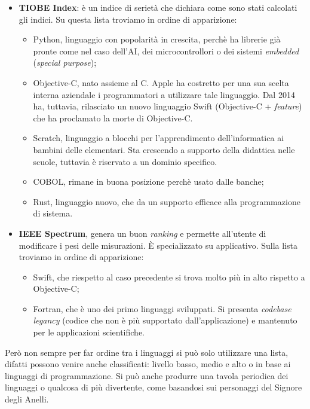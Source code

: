 \documentclass[10pt,a4paper]{book}
\begin{document}
\begin{itemize}
\item \textbf{TIOBE Index}: \`e un indice di seriet\`a che dichiara come sono stati calcolati gli indici. Su questa lista troviamo in ordine di apparizione:
\begin{itemize}
\item Python, linguaggio con popolarit\`a in crescita, perch\`e ha librerie gi\`a pronte come nel caso dell'AI, dei microcontrollori o dei sistemi \textit{embedded} (\textit{special purpose});
\item Objective-C, nato assieme al C. Apple ha costretto per una sua scelta interna aziendale i programmatori a utilizzare tale linguaggio. Dal 2014 ha, tuttavia, rilasciato un nuovo linguaggio Swift (Objective-C + \textit{feature}) che ha proclamato la morte di Objective-C.
\item Scratch, linguaggio a blocchi per l'apprendimento dell'informatica ai bambini delle elementari. Sta crescendo a supporto della didattica nelle scuole, tuttavia  \`e riservato a un dominio specifico.
\item COBOL, rimane in buona posizione perch\`e usato dalle banche;
\item Rust, linguaggio nuovo, che da un supporto efficace alla programmazione di sistema.
\end{itemize}
\item \textbf{IEEE Spectrum}, genera un buon \textit{ranking} e permette all'utente di modificare i pesi delle misurazioni. \`E specializzato su applicativo. Sulla lista troviamo in ordine di apparizione:
\begin{itemize}
\item Swift, che riespetto al caso precedente si trova molto pi\`u in alto rispetto a Objective-C;
\item Fortran, che \`e uno dei primo linguaggi sviluppati. Si presenta \textit{codebase legancy} (codice che non \`e pi\`u supportato dall'applicazione) e mantenuto per le applicazioni scientifiche.
\end{itemize}
\end{itemize}
\noindent
Per\`o non sempre per far ordine tra i linguaggi si pu\`o solo utilizzare una lista, difatti possono venire anche classificati: livello basso, medio e alto o in base ai linguaggi di programmazione. Si pu\`o anche produrre una tavola periodica dei linguaggi o  qualcosa di pi\`u divertente, come basandosi sui personaggi del Signore degli Anelli.\\\\
\end{document}
